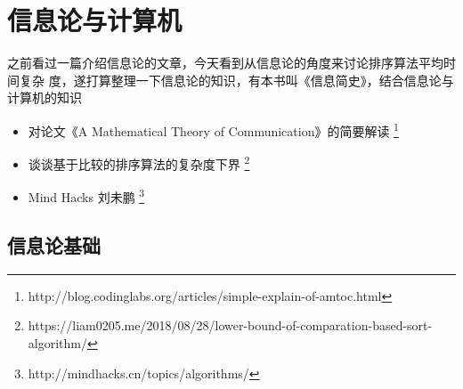 \chapter{信息论与计算机}\label{chap:communication-and-cs}

\begin{intro}
  之前看过一篇介绍信息论的文章，今天看到从信息论的角度来讨论排序算法平均时间复杂
  度，遂打算整理一下信息论的知识，有本书叫《信息简史》，结合信息论与计算机的知识
  \begin{itemize}
  \item 对论文《A Mathematical Theory of Communication》的简要解读%
    \footnote{http://blog.codinglabs.org/articles/simple-explain-of-amtoc.html}%
  \item 谈谈基于比较的排序算法的复杂度下界%
    \footnote{https://liam0205.me/2018/08/28/lower-bound-of-comparation-based-sort-algorithm/}%
  \item Mind Hacks 刘未鹏%
    \footnote{http://mindhacks.cn/topics/algorithms/}%
  \end{itemize}
\end{intro}

\section{信息论基础}\label{sec:communication-foundations}




\endinput
